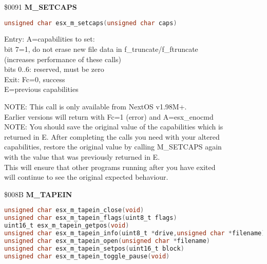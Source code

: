 \$0091 \textbf{M\_SETCAPS}

\begin{lstlisting}[language=C]
unsigned char esx_m_setcaps(unsigned char caps)
\end{lstlisting}

Entry: A=capabilities to set:\\
bit 7=1, do not erase new file data in f\_truncate/f\_ftruncate\\
(increases performance of these calls)\\
bits 0..6: reserved, must be zero\\
Exit: Fc=0, success\\
E=previous capabilities

NOTE: This call is only available from NextOS v1.98M+.\\
Earlier versions will return with Fc=1 (error) and A=esx\_enocmd\\
NOTE: You should save the original value of the capabilities which is\\
returned in E. After completing the calls you need with your altered\\
capabilities, restore the original value by calling M\_SETCAPS again\\
with the value that was previously returned in E.\\
This will ensure that other programs running after you have exited\\
will continue to see the original expected behaviour.

\$008B \textbf{M\_TAPEIN}

\begin{lstlisting}[language=C]
unsigned char esx_m_tapein_close(void)
unsigned char esx_m_tapein_flags(uint8_t flags)
uint16_t esx_m_tapein_getpos(void)
unsigned char esx_m_tapein_info(uint8_t *drive,unsigned char *filename)
unsigned char esx_m_tapein_open(unsigned char *filename)
unsigned char esx_m_tapein_setpos(uint16_t block)
unsigned char esx_m_tapein_toggle_pause(void)
\end{lstlisting}

